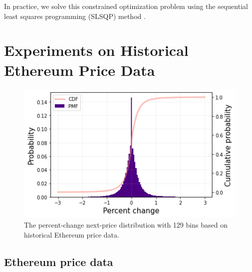 \documentclass[sigconf, usenames, dvipsnames]{acmart}
\newcommand{\dcp}[1]{\textcolor{blue}{{\scriptsize{David:}}#1}}
\newcommand{\rithvik}[1]{\textcolor{cyan}{{\scriptsize{Rithvik: }}[[#1]]}}
\begin{document}



In practice, we solve this constrained optimization problem using the sequential least squares programming (SLSQP) method \cite{boggs1995sequential}. 

\section{Experiments on Historical Ethereum Price Data}
\label{sec:results}


\begin{figure}
    \centering
    \includegraphics[width=\linewidth]{img/eth_dist.png}
    \caption{The percent-change next-price distribution with 129 bins based on historical Ethereum price data.
    \label{fig:eth_dist}}
\end{figure}

\subsection{Ethereum price data}
\end{document}

